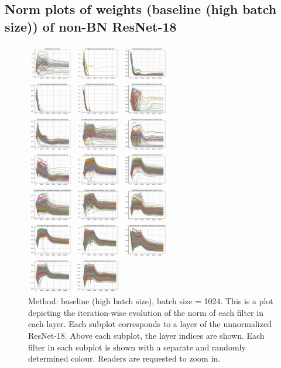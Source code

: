 \documentclass[runningheads]{llncs}
\begin{document}
\clearpage

\subsection{Norm plots of weights (baseline (high batch size)) of non-BN ResNet-18}
\label{sec:plots2}
\begin{figure}[ht]
\centering
\includegraphics[width=0.57\textwidth]{compressed/baseline_high_bs-w_norm}
\caption{ Method: baseline (high batch size), batch size = 1024. This is a plot
depicting the iteration-wise evolution of the norm of each filter in each layer. Each
subplot corresponds to a layer of the unnormalized ResNet-18. Above each subplot, the
layer indices are shown. Each filter in each subplot is shown with a separate and
randomly determined colour. Readers are requested to zoom in. } \end{figure}

\clearpage
\end{document}
